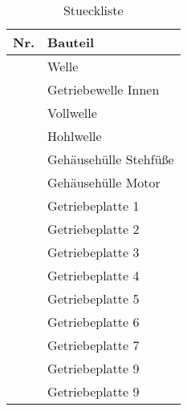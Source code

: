 \documentclass[11pt, a4paper]{scrartcl}
\newcounter{RowNum}
\newcommand{\RowNum}{\stepcounter{RowNum}\arabic{RowNum}}
\begin{document}
\newpage
\begin{table}[h!]
\caption{Stueckliste}
\label{tab:Stueckliste_Temp}
\begin{tabular}{c|l}
    \textbf{Nr.} & \textbf{Bauteil} \\
    \hline
    \hypertarget{Welle1}{\RowNum} & Welle\\
    \RowNum & Getriebewelle Innen\\
    \RowNum & Vollwelle\\
    \RowNum & Hohlwelle\\
    \RowNum & Gehäusehülle Stehfüße\\
    \RowNum & Gehäusehülle Motor\\
    \hypertarget{list_Platte1}{\RowNum} & Getriebeplatte 1\\
    \RowNum & Getriebeplatte 2\\
    \RowNum & Getriebeplatte 3\\
    \RowNum & Getriebeplatte 4\\
    \RowNum & Getriebeplatte 5\\
    \RowNum & Getriebeplatte 6\\
    \RowNum & Getriebeplatte 7\\
    \RowNum & Getriebeplatte 9\\
    \RowNum & Getriebeplatte 9\\
\end{tabular}
\end{table}
\end{document}
